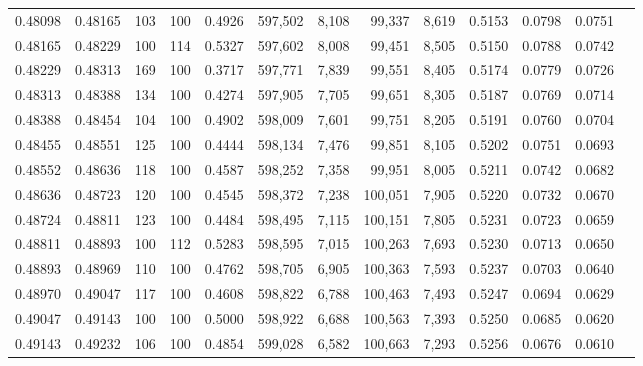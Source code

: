 \begin{tabular}{rrrrrrrrrrrrr}
0.48098 & 0.48165 &   103 & 100 &                                     0.4926 & 597,502 &   8,108 &  99,337 &   8,619 & 0.5153 & 0.0798 & 0.0751 \\
0.48165 & 0.48229 &   100 & 114 &                                     0.5327 & 597,602 &   8,008 &  99,451 &   8,505 & 0.5150 & 0.0788 & 0.0742 \\
0.48229 & 0.48313 &   169 & 100 &                                     0.3717 & 597,771 &   7,839 &  99,551 &   8,405 & 0.5174 & 0.0779 & 0.0726 \\
0.48313 & 0.48388 &   134 & 100 &                                     0.4274 & 597,905 &   7,705 &  99,651 &   8,305 & 0.5187 & 0.0769 & 0.0714 \\
0.48388 & 0.48454 &   104 & 100 &                                     0.4902 & 598,009 &   7,601 &  99,751 &   8,205 & 0.5191 & 0.0760 & 0.0704 \\
0.48455 & 0.48551 &   125 & 100 &                                     0.4444 & 598,134 &   7,476 &  99,851 &   8,105 & 0.5202 & 0.0751 & 0.0693 \\
0.48552 & 0.48636 &   118 & 100 &                                     0.4587 & 598,252 &   7,358 &  99,951 &   8,005 & 0.5211 & 0.0742 & 0.0682 \\
0.48636 & 0.48723 &   120 & 100 &                                     0.4545 & 598,372 &   7,238 & 100,051 &   7,905 & 0.5220 & 0.0732 & 0.0670 \\
0.48724 & 0.48811 &   123 & 100 &                                     0.4484 & 598,495 &   7,115 & 100,151 &   7,805 & 0.5231 & 0.0723 & 0.0659 \\
0.48811 & 0.48893 &   100 & 112 &                                     0.5283 & 598,595 &   7,015 & 100,263 &   7,693 & 0.5230 & 0.0713 & 0.0650 \\
0.48893 & 0.48969 &   110 & 100 &                                     0.4762 & 598,705 &   6,905 & 100,363 &   7,593 & 0.5237 & 0.0703 & 0.0640 \\
0.48970 & 0.49047 &   117 & 100 &                                     0.4608 & 598,822 &   6,788 & 100,463 &   7,493 & 0.5247 & 0.0694 & 0.0629 \\
0.49047 & 0.49143 &   100 & 100 &                                     0.5000 & 598,922 &   6,688 & 100,563 &   7,393 & 0.5250 & 0.0685 & 0.0620 \\
0.49143 & 0.49232 &   106 & 100 &                                     0.4854 & 599,028 &   6,582 & 100,663 &   7,293 & 0.5256 & 0.0676 & 0.0610 \\

\end{tabular}
